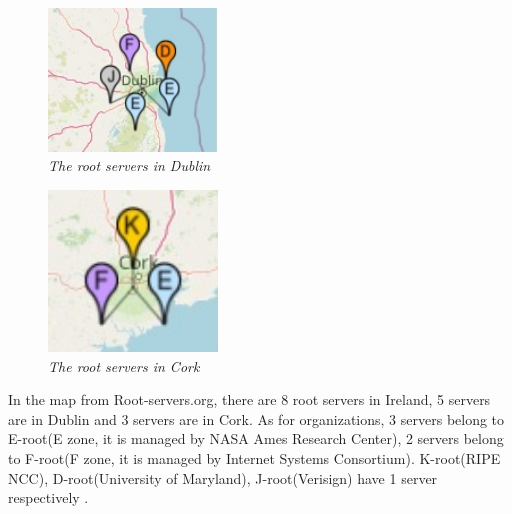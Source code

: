 \begin{figure}[hbt!]  
    \centering
    \includegraphics[width=0.4\textwidth]{figure/root-server-map-dublin.jpg}
    \caption{\em The root servers in Dublin \cite{root_servers_org} \label{fig:root_servers_dublin}}
\end{figure}

\begin{figure}[hbt!]  
    \centering
    \includegraphics[width=0.4\textwidth]{figure/root-server-map-cork.jpg}
    \caption{\em The root servers in Cork \cite{root_servers_org} \label{fig:root_servers_cork}}
\end{figure}

In the map from Root-servers.org, there are 8 root servers in Ireland, 5 servers are in Dublin and 3 servers are in Cork. As for organizations, 3 servers belong to E-root(E zone, it is managed by NASA Ames Research Center), 2 servers belong to F-root(F zone, it is managed by Internet Systems Consortium). K-root(RIPE NCC), D-root(University of Maryland), J-root(Verisign) have 1 server respectively \cite{root_servers_org}.
\\

